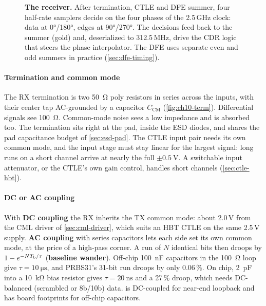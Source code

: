 \begin{figure}[tbp]
\caption{\textbf{The \OS{} receiver.} After termination, CTLE and DFE summer, four half-rate samplers decide on the four phases of the 2.5\,GHz clock: data at \ang{0}/\ang{180}, edges at \ang{90}/\ang{270}. The decisions feed back to the summer (gold) and, deserialized to 312.5\,MHz, drive the CDR logic that steers the phase interpolator. The DFE uses separate even and odd summers in practice (\cref{sec:dfe-timing}).}
\label{fig:ch10-arch}
\end{figure}

\paragraph{Termination and common mode} The RX termination is two \qty{50}{\ohm} poly resistors in series across the inputs, with their center tap AC-grounded by a capacitor $C_\mathrm{CM}$ (\cref{fig:ch10-term}). Differential signals see \qty{100}{\ohm}. Common-mode noise sees a low impedance and is absorbed too. The termination sits right at the pad, inside the ESD diodes, and shares the pad capacitance budget of \cref{sec:esd-pad}. The CTLE input pair needs its own common mode, and the input stage must stay linear for the largest signal: long runs on a short channel arrive at nearly the full $\pm\qty{0.5}{\volt}$. A switchable input attenuator, or the CTLE's own gain control, handles short channels (\cref{sec:ctle-hbt}).

\paragraph{DC or AC coupling} With \textbf{DC coupling} the RX inherits the TX common mode: about 2.0\,V from the CML driver of \cref{sec:cml-driver}, which suits an HBT CTLE on the same 2.5\,V supply. \textbf{AC coupling} with series capacitors lets each side set its own common mode, at the price of a high-pass corner. A run of $N$ identical bits then droops by $1-e^{-NT_\mathrm{b}/\tau}$ (\textbf{baseline wander}). Off-chip \qty{100}{\nano\farad} capacitors in the \qty{100}{\ohm} loop give $\tau=\qty{10}{\micro\second}$, and PRBS31's 31-bit run droops by only 0.06\,\%. On chip, \qty{2}{\pico\farad} into a \qty{10}{\kilo\ohm} bias resistor gives $\tau=\qty{20}{\nano\second}$ and a 27\,\% droop, which needs DC-balanced (scrambled or 8b/10b) data. \OS{} is DC-coupled for near-end loopback and has board footprints for off-chip capacitors.

